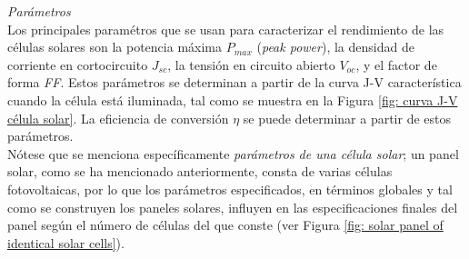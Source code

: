 \documentclass[12pt]{article}
\begin{document}
	\noindent \textit{Parámetros}\\
	
	\noindent Los principales paramétros que se usan para caracterizar el rendimiento de las células solares son la potencia máxima $P_{max}$ (\textit{peak power}), la densidad de corriente en cortocircuito $J_{sc}$, la tensión en circuito abierto $V_{oc}$, y el factor de forma \textit{FF}. Estos parámetros se determinan a partir de la curva J-V característica cuando la célula está iluminada, tal como se muestra en la Figura \ref{fig: curva J-V célula solar}. La eficiencia de conversión $\eta$ se puede determinar a partir de estos parámetros. \\
	
	\noindent Nótese que se menciona específicamente \textit{parámetros de una célula solar}; un panel solar, como se ha mencionado anteriormente, consta de varias células fotovoltaicas, por lo que los parámetros especificados, en términos globales y tal como se construyen los paneles solares, influyen en las especificaciones finales del panel según el número de células del que conste (ver Figura \ref{fig: solar panel of identical solar cells}). \\
\end{document}
